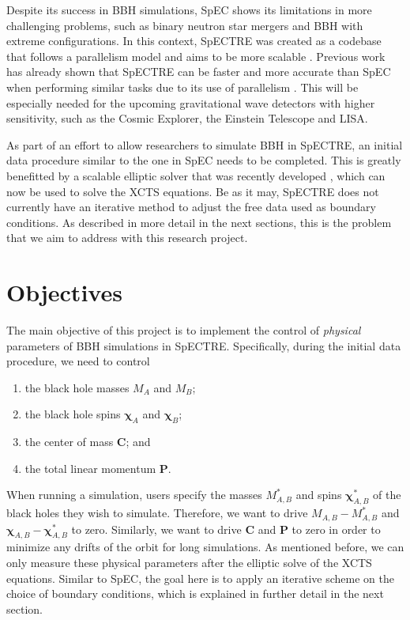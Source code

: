 \documentclass{../letter}
\renewcommand{\v}[1]{\boldsymbol{#1}}
\begin{document}
	Despite its success in BBH simulations, SpEC shows its limitations in more challenging problems, such as binary neutron star mergers and BBH with extreme configurations. In this context, SpECTRE \cite{SpECTRE} was created as a codebase that follows a parallelism model and aims to be more scalable \cite{Kidder}. Previous work has already shown that SpECTRE can be faster and more accurate than SpEC when performing similar tasks due to its use of parallelism \cite{Vu}. This will be especially needed for the upcoming gravitational wave detectors with higher sensitivity, such as the Cosmic Explorer, the Einstein Telescope and LISA.
	
	As part of an effort to allow researchers to simulate BBH in SpECTRE, an initial data procedure similar to the one in SpEC needs to be completed. This is greatly benefitted by a scalable elliptic solver that was recently developed \cite{Vu}, which can now be used to solve the XCTS equations. Be as it may, SpECTRE does not currently have an iterative method to adjust the free data used as boundary conditions. As described in more detail in the next sections, this is the problem that we aim to address with this research project.

	\section{Objectives}

	The main objective of this project is to implement the control of \textit{physical} parameters of BBH simulations in SpECTRE. Specifically, during the initial data procedure, we need to control
	\begin{enumerate}
		\item the black hole masses $M_A$ and $M_B$;
		\item the black hole spins $\v \chi_A$ and $\v \chi_B$;
		\item the center of mass $\v C$; and
		\item the total linear momentum $\v P$.
	\end{enumerate}
	
	When running a simulation, users specify the masses $M_{A,B}^*$ and spins $\v \chi_{A,B}^*$ of the black holes they wish to simulate. Therefore, we want to drive $M_{A,B} - M_{A,B}^*$ and $\v \chi_{A,B} - \v \chi_{A,B}^*$ to zero. Similarly, we want to drive $\v C$ and $\v P$ to zero in order to minimize any drifts of the orbit for long simulations. As mentioned before, we can only measure these physical parameters after the elliptic solve of the XCTS equations. Similar to SpEC, the goal here is to apply an iterative scheme on the choice of boundary conditions, which is explained in further detail in the next section.
\end{document}
